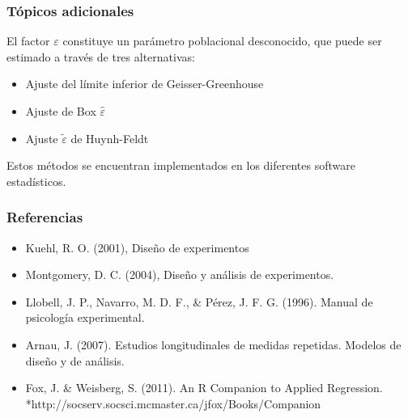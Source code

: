 \documentclass[12pt]{beamer}
\begin{document}
\begin{frame}
\frametitle{Tópicos adicionales}
El factor $\varepsilon$ constituye un parámetro poblacional desconocido, que puede ser estimado a través de
tres alternativas:
\begin{itemize}
\item Ajuste del límite inferior de Geisser-Greenhouse
\item Ajuste de Box $\hat{\varepsilon}$
\item Ajuste $\tilde{\varepsilon}$ de Huynh-Feldt
\end{itemize}

Estos métodos se encuentran implementados en los diferentes software estadísticos.
\end{frame}
\begin{frame}
\frametitle{Referencias}
\begin{itemize}
\item Kuehl, R. O. (2001), Diseño de experimentos

\item Montgomery, D. C. (2004), Diseño y análisis de experimentos.

\item Llobell, J. P., Navarro, M. D. F., \& Pérez, J. F. G. (1996). Manual de psicología experimental.

\item Arnau, J. (2007). Estudios longitudinales de medidas repetidas. Modelos de diseño y de análisis. 

\item Fox, J. \&  Weisberg, S. (2011). An {R} Companion to Applied Regression.
*http://socserv.socsci.mcmaster.ca/jfox/Books/Companion
\end{itemize}
\end{frame}
\end{document}
